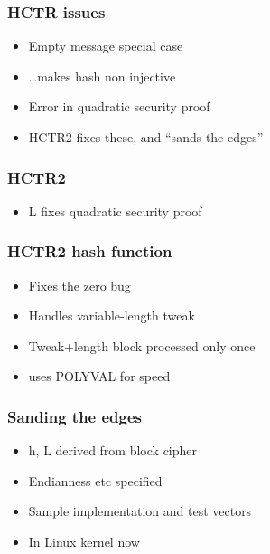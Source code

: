 \documentclass{beamer}
\begin{document}
\begin{frame}

\frametitle{HCTR issues}

\begin{itemize}
    \item Empty message special case
    \item …makes hash non injective
    \item Error in quadratic security proof
    \item HCTR2 fixes these, and “sands the edges”
\end{itemize}
\end{frame}

\begin{frame}

\frametitle{HCTR2}
\begin{figure}

\end{figure}
\begin{itemize}
    \item L fixes quadratic security proof
\end{itemize}

\end{frame}

\begin{frame}

\frametitle{HCTR2 hash function}

\begin{itemize}
    \item Fixes the zero bug
    \item Handles variable-length tweak
    \item Tweak+length block processed only once
    \item uses POLYVAL for speed
\end{itemize}
\end{frame}

\begin{frame}

\frametitle{Sanding the edges}

\begin{itemize}
    \item h, L derived from block cipher
    \item Endianness etc specified
    \item Sample implementation and test vectors
    \item In Linux kernel now
\end{itemize}
\end{frame}
\end{document}
